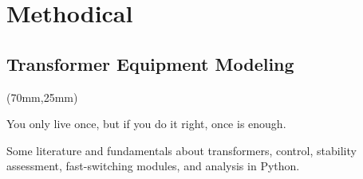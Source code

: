 
\begingroup
{}
\part{Methodical}

\endgroup



\chapter{Transformer Equipment Modeling}

\begin{textblock*}{.7\textwidth}(70mm,25mm)
        \begin{fquote}
                You only live once, but if you do it right, once is enough.
        \end{fquote}
\end{textblock*}

Some literature and fundamentals about transformers, control, stability assessment, fast-switching modules, and analysis in Python. 




